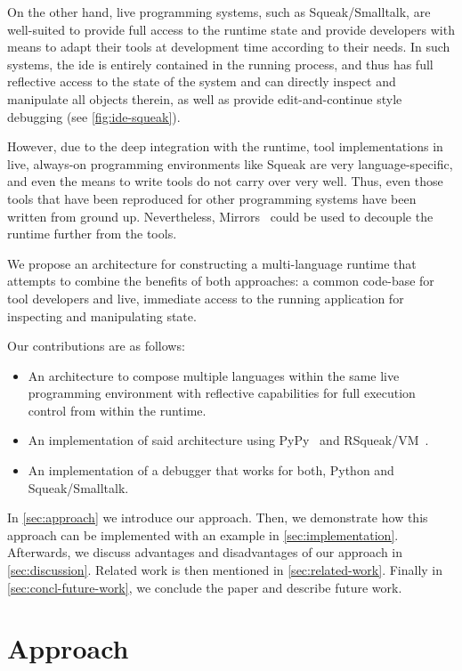 \documentclass[sigconf,english]{acmart}
\newcommand{\ac}[1]{\gls*{#1}}
\newcommand*\Squeak{Squeak\slash Smalltalk\xspace}
\begin{document}
On the other hand, live programming systems, such as \Squeak, are
well-suited to provide full access to the runtime state and provide developers
with means to adapt their tools at development time according to their needs.
In such systems, the \ac{ide} is entirely contained in the running process, and
thus has full reflective access to the state of the system and can directly
inspect and manipulate all objects therein, as well as provide
edit-and-continue style debugging (see \autoref{fig:ide-squeak}).

However, due to the deep integration with the runtime, tool implementations in
live, always-on programming environments like Squeak are very language-specific,
and even the means to write tools do not carry over very well. Thus, even those
tools that have been reproduced for other programming systems have been written
from ground up. Nevertheless, Mirrors~\cite{bracha2004mirrors} could be used to
decouple the runtime further from the tools.

We propose an architecture for constructing a multi-language runtime that
attempts to combine the benefits of both approaches: a common code-base for tool
developers and live, immediate access to the running application for inspecting
and manipulating state.

Our contributions are as follows:

\begin{itemize}
\item An architecture to compose multiple languages within the same live
  programming environment with reflective capabilities for full execution
  control from within the runtime.
\item An implementation of said architecture using
  PyPy~\cite{Rigo:2006:PAV:1176617.1176753} and
  RSqueak/VM~\cite{Felgentreff:2016:BHV:2991041.2991062,Bolz2008}.
\item An implementation of a debugger that works for both, Python and
  \Squeak.
\end{itemize}

In \autoref{sec:approach} we introduce our approach. Then, we demonstrate how
this approach can be implemented with an example in \autoref{sec:implementation}.
Afterwards, we discuss advantages and disadvantages of our approach in \autoref{sec:discussion}.
Related work is then mentioned in \autoref{sec:related-work}.
Finally in \autoref{sec:concl-future-work}, we conclude the paper and
describe future work.


\section{Approach}
\label{sec:approach}
\end{document}
